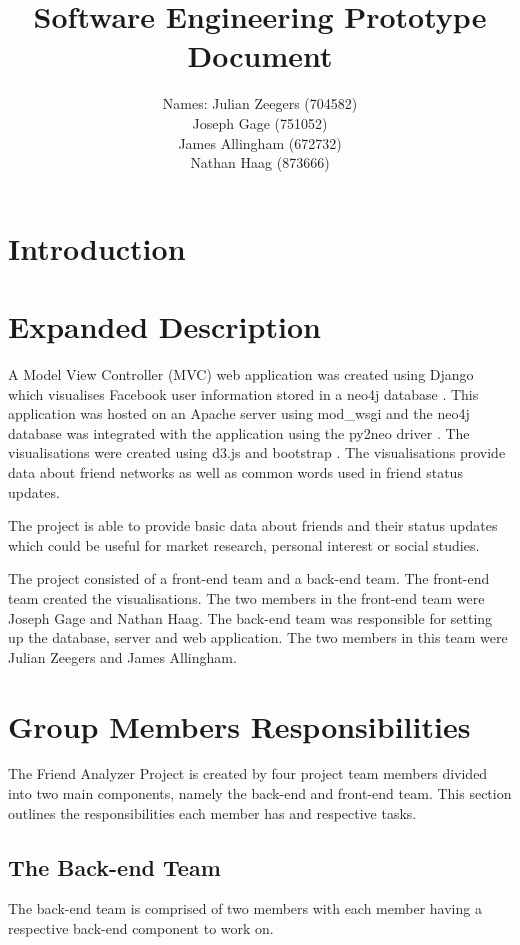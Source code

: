 \documentclass[10pt,onecolumn]{article}
\title{\vspace{-4.2cm}Software Engineering Prototype Document }
\author{ Names: Julian Zeegers (704582) \\  Joseph Gage (751052)\\James Allingham (672732) \\ Nathan Haag (873666) }
\begin{document}
\maketitle
\pagestyle{plain}
\setcounter{page}{1}


\section{Introduction}

\section{Expanded Description}
A Model View Controller (MVC) web application was created using Django \cite{django} which visualises Facebook user information stored in a neo4j database \cite{neo4j}. This application was hosted on an Apache server using mod\_wsgi \cite{wsgi} and the neo4j database was integrated with the application using the py2neo driver \cite{py2neo}. The visualisations were created using d3.js \cite{d3js} and bootstrap \cite{bootstrap}. The visualisations provide data about friend networks as well as common words used in friend status updates.

The project is able to provide basic data about friends and their status updates which could be useful for market research, personal interest or social studies.

The project consisted of a front-end team and a back-end team. The front-end team created the visualisations. The two members in the front-end team were Joseph Gage and Nathan Haag. The back-end team was responsible for setting up the database, server and web application. The two members in this team were Julian Zeegers and James Allingham.

\section{Group Members Responsibilities}
The Friend Analyzer Project is created by four project team members divided into two main components, namely the back-end and front-end team. This section outlines the responsibilities each member has and respective tasks. 


\subsection{The Back-end Team}
The back-end team is comprised of two members with each member having a respective back-end component to work on.
\end{document}
